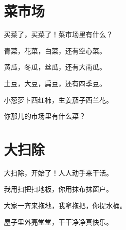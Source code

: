 \documentclass[12pt,UTF-8,openany]{ctexbook}
\begin{document}
\chapter{菜市场}

\begin{large}
    
    买菜了，买菜了！菜市场里有什么？
    
    青菜，花菜，白菜，还有空心菜。
    
    黄瓜，冬瓜，丝瓜，还有大南瓜。
    
    土豆，大豆，扁豆，还有四季豆。
    
    小葱萝卜西红柿，生姜茄子西兰花。
    
    你那儿的市场里有什么菜？
    
\end{large}


\clearpage

\begin{center}
    
    
\end{center}


\hanzibox{}\hanzibox{}\hanzibox{}\hanzibox{}\hspace{1em}\hanzibox{}\hanzibox{}\hanzibox{}\hanzibox{}

\hanzibox{}\hanzibox{}\hanzibox{}\hanzibox{}\hspace{1em}\hanzibox{}\hanzibox{}\hanzibox{}\hanzibox{}

\hanzibox{}\hanzibox{}\hanzibox{}\hanzibox{}\hspace{1em}\hanzibox{}\hanzibox{}\hanzibox{}\hanzibox{}






\chapter{大扫除}

\begin{large}
    
    大扫除，开始了！人人动手来干活。
    
    我用扫把扫地板，你用抹布抹窗户。
    
    大家一齐来拖地，我拿拖把，你提水桶。
    
    屋子里外亮堂堂，干干净净真快乐。
    
\end{large}
\end{document}

